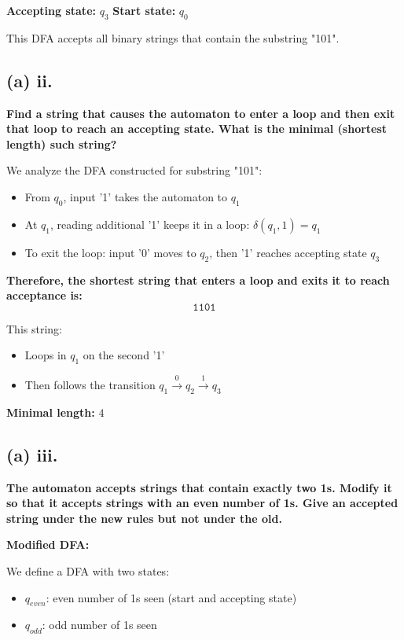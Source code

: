 \documentclass{article}
\begin{document}
\textbf{Accepting state:} \(q_3\)  
\textbf{Start state:} \(q_0\)

This DFA accepts all binary strings that contain the substring "101".

\subsection*{(a) ii.}

\textbf{Find a string that causes the automaton to enter a loop and then exit that loop to reach an accepting state. What is the minimal (shortest length) such string?}

We analyze the DFA constructed for substring "101":

\begin{itemize}
  \item From \(q_0\), input '1' takes the automaton to \(q_1\)
  \item At \(q_1\), reading additional '1' keeps it in a loop: \(\delta(q_1, 1) = q_1\)
  \item To exit the loop: input '0' moves to \(q_2\), then '1' reaches accepting state \(q_3\)
\end{itemize}

\textbf{Therefore, the shortest string that enters a loop and exits it to reach acceptance is:}
\[
\boxed{\texttt{1101}}
\]

This string:
\begin{itemize}
  \item Loops in \(q_1\) on the second '1'
  \item Then follows the transition \(q_1 \xrightarrow{0} q_2 \xrightarrow{1} q_3\)
\end{itemize}

\textbf{Minimal length:} \(\boxed{4}\)

\subsection*{(a) iii.}

\textbf{The automaton accepts strings that contain exactly two 1s. Modify it so that it accepts strings with an even number of 1s. Give an accepted string under the new rules but not under the old.}

\textbf{Modified DFA:}

We define a DFA with two states:
\begin{itemize}
  \item \(q_{even}\): even number of 1s seen (start and accepting state)
  \item \(q_{odd}\): odd number of 1s seen
\end{itemize}
\end{document}
